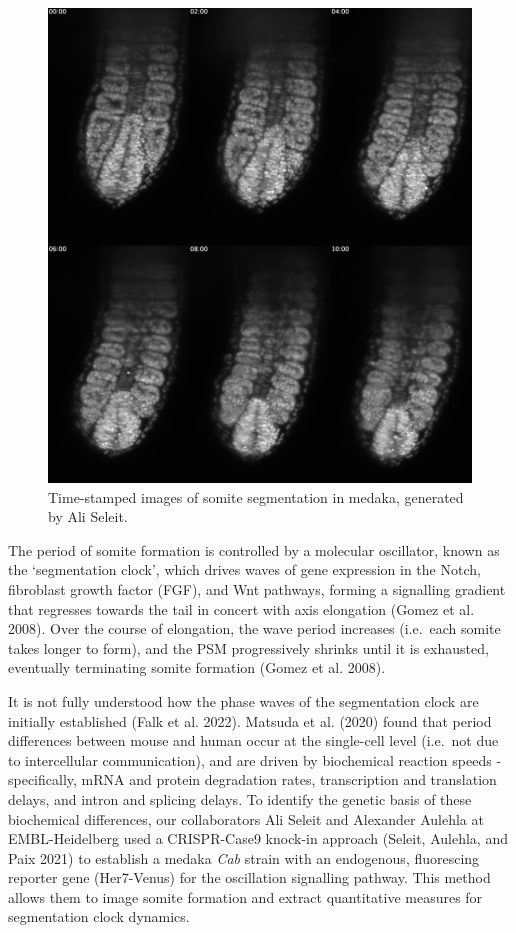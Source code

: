 \documentclass[
]{book}
\begin{document}
\begin{figure}

\includegraphics[width=1\linewidth]{figs/somites/ali_fish_seg_compiled} \hfill{}

\caption{Time-stamped images of somite segmentation in medaka, generated by Ali Seleit.}\label{fig:somite-seg-ali}
\end{figure}

The period of somite formation is controlled by a molecular oscillator, known as the `segmentation clock', which drives waves of gene expression in the Notch, fibroblast growth factor (FGF), and Wnt pathways, forming a signalling gradient that regresses towards the tail in concert with axis elongation (Gomez et al. 2008). Over the course of elongation, the wave period increases (i.e.~each somite takes longer to form), and the PSM progressively shrinks until it is exhausted, eventually terminating somite formation (Gomez et al. 2008).

It is not fully understood how the phase waves of the segmentation clock are initially established (Falk et al. 2022). Matsuda et al. (2020) found that period differences between mouse and human occur at the single-cell level (i.e.~not due to intercellular communication), and are driven by biochemical reaction speeds - specifically, mRNA and protein degradation rates, transcription and translation delays, and intron and splicing delays. To identify the genetic basis of these biochemical differences, our collaborators Ali Seleit and Alexander Aulehla at EMBL-Heidelberg used a CRISPR-Case9 knock-in approach (Seleit, Aulehla, and Paix 2021) to establish a medaka \emph{Cab} strain with an endogenous, fluorescing reporter gene (Her7-Venus) for the oscillation signalling pathway. This method allows them to image somite formation and extract quantitative measures for segmentation clock dynamics.
\end{document}
